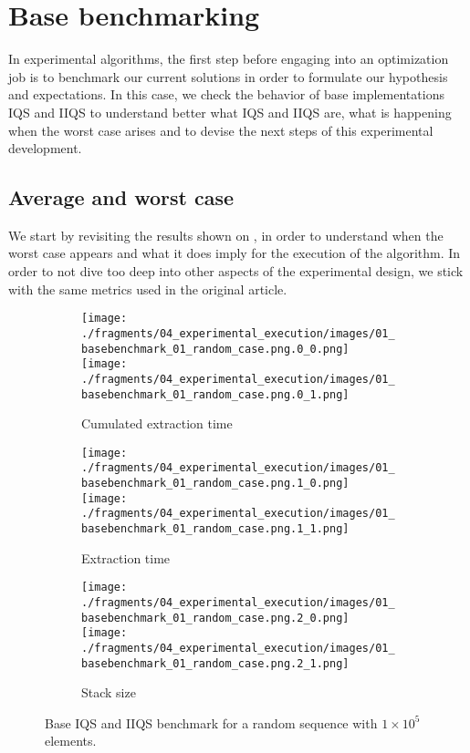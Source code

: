 \section{Base benchmarking}
\label{SUBSECTION:BASE_BENCHMARK}
In experimental algorithms, the first step before engaging into an optimization job is to benchmark our current solutions in order to formulate our hypothesis and expectations. In this case, we check the behavior of base implementations IQS and IIQS to understand better what IQS and IIQS are, what is happening when the worst case arises and to devise the next steps of this experimental development.\\

\subsection{Average and worst case}
\label{SUBSECTION:BASE_BENCHMARK__AVERAGE_WORST}

We start by revisiting the results shown on \cite{7416566}, in order to understand when the worst case appears and what it does imply for the execution of the algorithm. In order to not dive too deep into other aspects of the experimental design, we stick with the same metrics used in the original article.\\

\begin{figure}
    \centering
    \begin{subfigure}[b]{\textwidth}
        \centering
        \texttt{[image: ./fragments/04\_experimental\_execution/images/01\_basebenchmark\_01\_random\_case.png.0\_0.png]}
        \texttt{[image: ./fragments/04\_experimental\_execution/images/01\_basebenchmark\_01\_random\_case.png.0\_1.png]}
        \caption{Cumulated extraction time}
        \label{FIG:BENCHMARK_01_RANDOM_CASE__0_0}
    \end{subfigure}

    \begin{subfigure}[b]{\textwidth}
        \centering
        \texttt{[image: ./fragments/04\_experimental\_execution/images/01\_basebenchmark\_01\_random\_case.png.1\_0.png]}
        \texttt{[image: ./fragments/04\_experimental\_execution/images/01\_basebenchmark\_01\_random\_case.png.1\_1.png]}
        \caption{Extraction time}
        \label{FIG:BENCHMARK_01_RANDOM_CASE__0_1}
    \end{subfigure}

    \begin{subfigure}[b]{\textwidth}
        \centering
        \texttt{[image: ./fragments/04\_experimental\_execution/images/01\_basebenchmark\_01\_random\_case.png.2\_0.png]}
        \texttt{[image: ./fragments/04\_experimental\_execution/images/01\_basebenchmark\_01\_random\_case.png.2\_1.png]}
        \caption{Stack size}
        \label{FIG:BENCHMARK_01_RANDOM_CASE__0_2}
    \end{subfigure}
    
    \caption{Base IQS and IIQS benchmark for a random sequence with $1\times10^5$ elements.}
       \label{FIG:BENCHMARK_01_RANDOM_CASE}
\end{figure}


